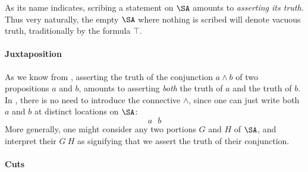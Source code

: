 \begin{scope}
\newpage
As its name indicates, scribing a statement on $\SA$ amounts to \emph{asserting
its truth}. Thus very naturally, the empty $\SA$ where nothing is scribed will
denote vacuous truth, traditionally  by the formula $\top$.


\paragraph{Juxtaposition}

As we know from , asserting the truth of the conjunction $a
\land b$ of two propositions $a$ and $b$, amounts to asserting \emph{both} the
truth of $a$ and the truth of $b$. In , there is no need to introduce
the  connective $\land$, since one can just write both $a$ and $b$ at
distinct locations on $\SA$:
$$a~~~b$$
\AP
More generally, one might consider any two portions $G$ and $H$ of $\SA$, and
interpret their  $G~H$ as signifying that we assert the
truth of their conjunction.

\paragraph{Cuts}


\end{scope}
